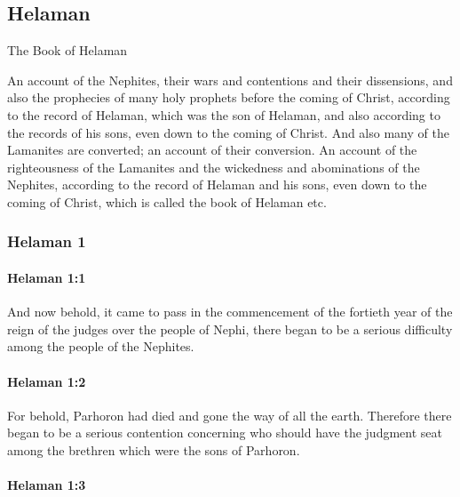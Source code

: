 \subsection{Helaman}
	\label{HELAMAN}
	
	The Book of Helaman

	An account of the Nephites,
	their wars and contentions and their dissensions,
	and also the prophecies of many holy prophets before the coming of Christ,
	according to the record of Helaman, which was the son of Helaman,
	and also according to the records of his sons,
	even down to the coming of Christ.
	And also many of the Lamanites are converted;
	an account of their conversion.
	An account of the righteousness of the Lamanites
	and the wickedness and abominations of the Nephites,
	according to the record of Helaman and his sons,
	even down to the coming of Christ,
	which is called the book of Helaman etc.
	
	\subsubsection{Helaman 1} %
		\label{HELAMAN-1}
		
		\paragraph{Helaman 1:1} %
			\label{HELAMAN-1-1}

			And now behold, it came to pass in the commencement of the fortieth year
			of the reign of the judges over the people of Nephi,
			there began to be a serious difficulty among the people of the Nephites.

		\paragraph{Helaman 1:2} %
			\label{HELAMAN-1-2}

			For behold, Parhoron had died and gone the way of all the earth.
			Therefore there began to be a serious contention
			concerning who should have the judgment seat
			among the brethren which were the sons of Parhoron.

		\paragraph{Helaman 1:3} %
			\label{HELAMAN-1-3}

